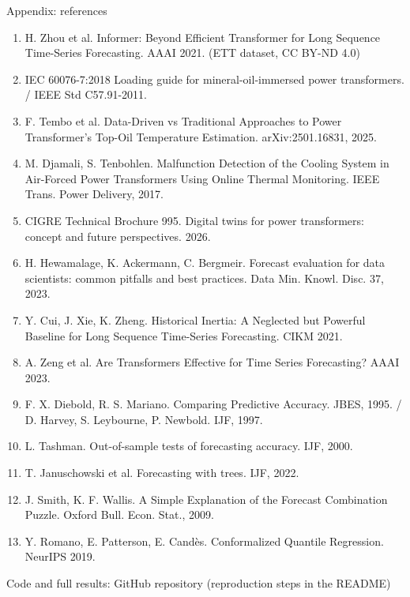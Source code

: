 \documentclass[aspectratio=169,10pt]{beamer}
\begin{document}
\begin{frame}{Appendix: references}
  \tiny
  \begin{enumerate}\setlength{\itemsep}{0pt}
    \item H. Zhou et al. Informer: Beyond Efficient Transformer for Long Sequence Time-Series Forecasting. AAAI 2021. (ETT dataset, CC BY-ND 4.0)
    \item IEC 60076-7:2018 Loading guide for mineral-oil-immersed power transformers. / IEEE Std C57.91-2011.
    \item F. Tembo et al. Data-Driven vs Traditional Approaches to Power Transformer's Top-Oil Temperature Estimation. arXiv:2501.16831, 2025.
    \item M. Djamali, S. Tenbohlen. Malfunction Detection of the Cooling System in Air-Forced Power Transformers Using Online Thermal Monitoring. IEEE Trans. Power Delivery, 2017.
    \item CIGRE Technical Brochure 995. Digital twins for power transformers: concept and future perspectives. 2026.
    \item H. Hewamalage, K. Ackermann, C. Bergmeir. Forecast evaluation for data scientists: common pitfalls and best practices. Data Min. Knowl. Disc. 37, 2023.
    \item Y. Cui, J. Xie, K. Zheng. Historical Inertia: A Neglected but Powerful Baseline for Long Sequence Time-Series Forecasting. CIKM 2021.
    \item A. Zeng et al. Are Transformers Effective for Time Series Forecasting? AAAI 2023.
    \item F. X. Diebold, R. S. Mariano. Comparing Predictive Accuracy. JBES, 1995. / D. Harvey, S. Leybourne, P. Newbold. IJF, 1997.
    \item L. Tashman. Out-of-sample tests of forecasting accuracy. IJF, 2000.
    \item T. Januschowski et al. Forecasting with trees. IJF, 2022.
    \item J. Smith, K. F. Wallis. A Simple Explanation of the Forecast Combination Puzzle. Oxford Bull. Econ. Stat., 2009.
    \item Y. Romano, E. Patterson, E. Candès. Conformalized Quantile Regression. NeurIPS 2019.
  \end{enumerate}
  \vspace{0.2cm}
  {\scriptsize\color{muted}Code and full results: GitHub repository (reproduction steps in the README)}
\end{frame}
\end{document}
